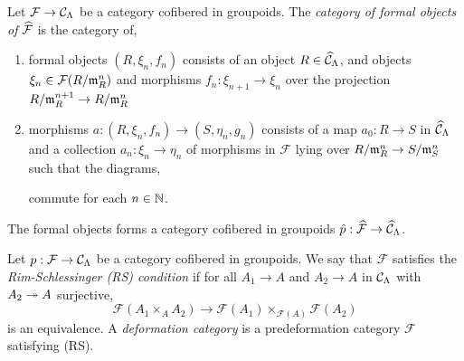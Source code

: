 \documentclass[12pt]{article}
\renewcommand{\F}{\mathcal{F}}
\begin{document}
\begin{defn}
Let $\F \to \C_\Lambda$ be a category cofibered in groupoids. The \textit{category of formal objects of} $\wh{\F}$ is the category of,
\begin{enumerate}
\item formal objects $(R, \xi_n, f_n)$ consists of an object $R \in \widehat{\mathcal{C}}_\Lambda$, and objects $\xi_n \in \F(R/\m_R^n)$ and morphisms $f_n : \xi_{n+1} \to \xi_n$ over the projection $R / \mathfrak{m}_R^{n+1} \to R / \mathfrak{m}_R^n$

\item morphisms $a : (R, \xi_n, f_n) \to (S, \eta_n, g_n)$ consists of a map $a_0 : R \to S$ in $\widehat{\mathcal{C}}_\Lambda$ and a collection $a_n : \xi_n \to \eta_n$ of morphisms in $\F$ lying over $R / \mathfrak{m}_R^n \to S / \mathfrak{m}_S^n$ such that the diagrams,
\begin{center}
\end{center} 
commute for each $n \in \mathbb{N}$.
\end{enumerate}
\end{defn}

\begin{prop}
The formal objects forms a category cofibered in groupoids $\hat{p} : \wh{\F} \to \wh{\C}_\Lambda$.
\end{prop}

\begin{defn}
Let $p : \F \to \C_\Lambda$ be a category cofibered in groupoids. We say that $\F$ satisfies the \textit{Rim-Schlessinger (RS) condition} if for all $A_1 \to A$ and $A_2 \to A$ in $\mathcal{C}_\Lambda$ with $A_2 \twoheadrightarrow A$ surjective,
\[ \F(A_1 \times_A A_2) \to \F(A_1) \times_{\F(A)} \F(A_2) \]
is an equivalence. A \textit{deformation category} is a predeformation category $\F$ satisfying (RS).
\end{defn}
\end{document}

